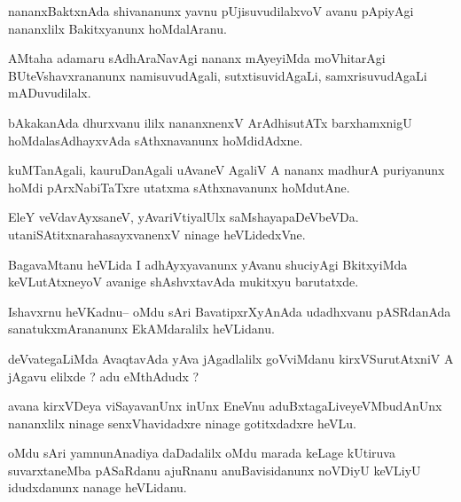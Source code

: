 \documentclass{article}
\begin{document}
\begin{mn}%
nananxBaktxnAda shivananunx yavnu pUjisuvudilalxvoV avanu pApiyAgi nananxlilx Bakitxyanunx 
hoMdalAranu.
\end{mn}

\begin{mn}%
AMtaha adamaru sAdhAraNavAgi nananx mAyeyiMda moVhitarAgi BUteVshavxrananunx 
namisuvudAgali, sutxtisuvidAgaLi, samxrisuvudAgaLi mADuvudilalx.
\end{mn}

\begin{mn}%
bAkakanAda dhurxvanu ililx nananxnenxV ArAdhisutATx barxhamxnigU hoMdalasAdhayxvAda 
sAthxnavanunx hoMdidAdxne.
\end{mn}

\begin{mn}%
kuMTanAgali, kauruDanAgali uAvaneV AgaliV A nananx madhurA puriyanunx hoMdi pArxNabiTaTxre 
utatxma sAthxnavanunx hoMdutAne.
\end{mn}

\begin{mn}%
EleY veVdavAyxsaneV, yAvariVtiyalUlx saMshayapaDeVbeVDa. utaniSAtitxnarahasayxvanenxV 
ninage heVLidedxVne.
\end{mn}

\begin{mn}%
BagavaMtanu heVLida I adhAyxyavanunx yAvanu shuciyAgi BkitxyiMda keVLutAtxneyoV avanige 
shAshvxtavAda mukitxyu barutatxde.
\end{mn}


\begin{mn}%
Ishavxrnu heVKadnu-- oMdu sAri BavatipxrXyAnAda udadhxvanu pASRdanAda sanatukxmArananunx 
EkAMdaralilx heVLidanu.
\end{mn}

\begin{mn}%
deVvategaLiMda AvaqtavAda yAva jAgadlalilx goVviMdanu kirxVSurutAtxniV A jAgavu elilxde ? 
adu eMthAdudx ?
\end{mn}

\begin{mn}%
avana kirxVDeya viSayavanUnx inUnx EneVnu aduBxtagaLiveyeVMbudAnUnx nananxlilx ninage 
senxVhavidadxre ninage gotitxdadxre heVLu.
\end{mn}

\begin{mn}%
oMdu sAri yamnunAnadiya daDadalilx oMdu marada keLage kUtiruva suvarxtaneMba pASaRdanu 
ajuRnanu anuBavisidanunx noVDiyU keVLiyU idudxdanunx nanage heVLidanu.
\end{mn}
\end{document}
